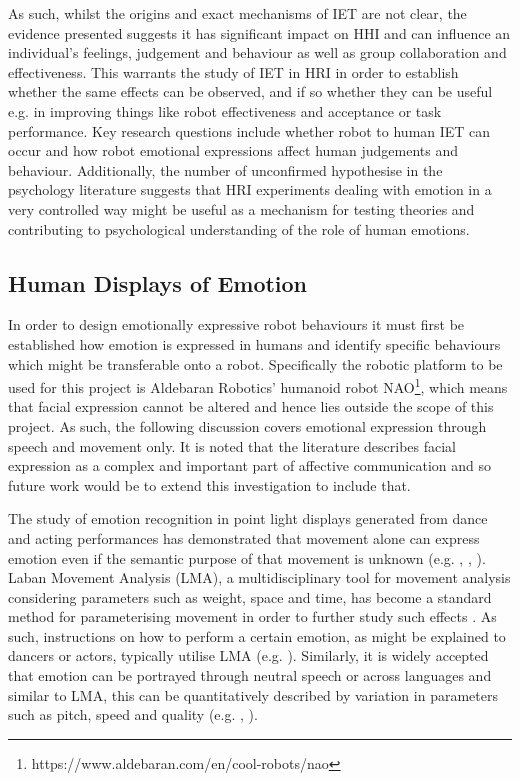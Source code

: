 \documentclass[11pt,a4paper]{report}
\begin{document}
As such, whilst the origins and exact mechanisms of IET are not clear, the evidence presented suggests it has significant impact on HHI and can influence an individual's feelings, judgement and behaviour as well as group collaboration and effectiveness. This warrants the study of IET in HRI in order to establish whether the same effects can be observed, and if so whether they can be useful e.g. in improving things like robot effectiveness and acceptance or task performance. Key research questions include whether robot to human IET can occur and how robot emotional expressions affect human judgements and behaviour. Additionally, the number of unconfirmed hypothesise in the psychology literature suggests that HRI experiments dealing with emotion in a very controlled way might be useful as a mechanism for testing theories and contributing to psychological understanding of the role of human emotions. 


\subsection{Human Displays of Emotion}
In order to design emotionally expressive robot behaviours it must first be established how emotion is expressed in humans and identify specific behaviours which might be transferable onto a robot. Specifically the robotic platform to be used for this project is Aldebaran Robotics' humanoid robot NAO\footnote{https://www.aldebaran.com/en/cool-robots/nao}, which means that facial expression cannot be altered and hence lies outside the scope of this project.  As such, the following discussion covers emotional expression through speech and movement only. It is noted that the literature describes facial expression as a complex and important part of affective communication and so future work would be to extend this investigation to include that.

The study of emotion recognition in point light displays generated from dance and acting performances has demonstrated that movement alone can express emotion even if the semantic purpose of that movement is unknown (e.g. \cite{dittrich1996perception}, \cite{pollick2001perceiving}, \cite{atkinson2004emotion}). Laban Movement Analysis (LMA), a multidisciplinary tool for movement analysis considering parameters such as weight, space and time, has become a standard method for parameterising movement in order to further study such effects \cite{lab2011}. As such, instructions on how to perform a certain emotion, as might be explained to dancers or actors, typically utilise LMA (e.g. \cite{newlove1993laban}). Similarly, it is widely accepted that emotion can be portrayed through neutral speech \cite{neumann2000mood} or across languages \cite{scherer2000cross} and similar to LMA, this can be quantitatively described by variation in parameters such as pitch, speed and quality (e.g. \cite{scherer1986vocal}, \cite{cowie2001emotion}). 
\end{document}
